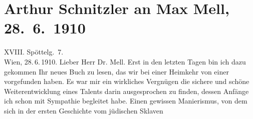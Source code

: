 

         
         \newcommand{\erwaehntePersonen}{Personen: Max Mell, Maria Mell, Olga Schnitzler}
         \newcommand{\erwaehnteInstitutionen}{}
         \newcommand{\erwaehnteOrte}{Orte: Edmund-Weiß-Gasse, Schweiz, Wien}
         \newcommand{\erwaehnteWerke}{Werke: Geschichte eines jüdischen Sklaven, Jägerhaussage und andere Novellen}
               \section[Arthur Schnitzler an Max Mell, 28. 6. 1910]{ Arthur Schnitzler an Max Mell, 28. 6. 1910}\nopagebreak{}\rehead{ }\begin{ledgroupsized}[t]{13cm}\normalsize\beginnumbering \toendnotes[C]{\smallbreak\pagebreak[2]} 
\toendnotes[C]{\smallbreak}\pstart
           \raggedleft{}{\pb}XVIII. Spöttelg. 7.{\\}Wien, 28. 6. 1910.\pend
           \pstart\center{}Lieber Herr Dr. Mell.\pend\pstart
           Erst in den letzten Tagen bin ich dazu gekommen Ihr neues Buch zu lesen, das wir bei einer
                    Heimkehr von einer \label{K_L01940_1v}\label{K_L01940_1h}
                    vorgefunden haben. Es war mir ein wirkliches Vergnügen die sichere und schöne
                    Weiterentwicklung eines Talents darin ausgesprochen zu finden, dessen Anfänge
                    ich schon mit Sympathie begleitet habe. Einen gewissen Manierismus, von dem sich
                    in der ersten Geschichte vom jüdischen Sklaven

\end{ledgroupsized}
